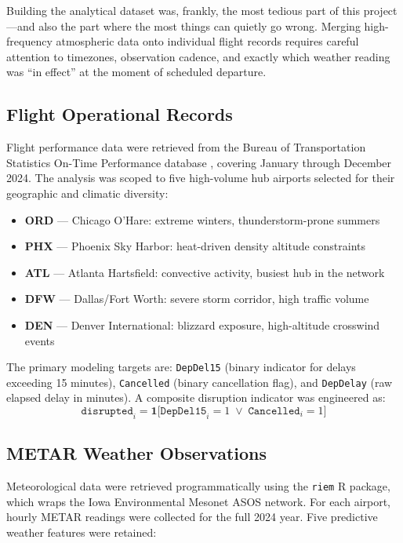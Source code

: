 \documentclass[12pt, a4paper]{article}
\begin{document}
Building the analytical dataset was, frankly, the most tedious part of this project---and also the part where the most things can quietly go wrong. Merging high-frequency atmospheric data onto individual flight records requires careful attention to timezones, observation cadence, and exactly which weather reading was ``in effect'' at the moment of scheduled departure.

\subsection{Flight Operational Records}

Flight performance data were retrieved from the Bureau of Transportation Statistics On-Time Performance database \citep{bts2024}, covering January through December 2024. The analysis was scoped to five high-volume hub airports selected for their geographic and climatic diversity:

\begin{itemize}[itemsep=2pt]
    \item \textbf{ORD} — Chicago O'Hare: extreme winters, thunderstorm-prone summers
    \item \textbf{PHX} — Phoenix Sky Harbor: heat-driven density altitude constraints
    \item \textbf{ATL} — Atlanta Hartsfield: convective activity, busiest hub in the network
    \item \textbf{DFW} — Dallas/Fort Worth: severe storm corridor, high traffic volume
    \item \textbf{DEN} — Denver International: blizzard exposure, high-altitude crosswind events
\end{itemize}

\noindent The primary modeling targets are: \texttt{DepDel15} (binary indicator for delays exceeding 15 minutes), \texttt{Cancelled} (binary cancellation flag), and \texttt{DepDelay} (raw elapsed delay in minutes). A composite disruption indicator was engineered as:
\begin{equation}
    \texttt{disrupted}_i = \mathbf{1}\bigl[\texttt{DepDel15}_i = 1 \;\lor\; \texttt{Cancelled}_i = 1\bigr]
\end{equation}

\subsection{METAR Weather Observations}

Meteorological data were retrieved programmatically using the \texttt{riem} R package, which wraps the Iowa Environmental Mesonet ASOS network. For each airport, hourly METAR readings were collected for the full 2024 year. Five predictive weather features were retained:
\end{document}
